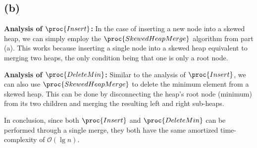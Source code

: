 \subsection{(b)}

\textbf{Analysis of $\proc{Insert}$:} In the case of inserting a new node into a skewed heap, we can simply employ the
$\proc{SkewedHeapMerge}$ algorithm from part (a). This works because inserting a single
node into a skewed heap equivalent to merging two heaps, the only condition being that one
is only a root node.\vspace{3mm}

\textbf{Analysis of $\proc{DeleteMin}$:} Similar to the analysis of $\proc{Insert}$, we can also use $\proc{SkewedHeapMerge}$
to delete the minimum element from a skewed heap.
This can be done by disconnecting the heap's root node (minimum) from its two children
and merging the resulting left and right sub-heaps.\vspace{3mm}

In conclusion, since both $\proc{Insert}$ and $\proc{DeleteMin}$ can be performed through
a single merge, they both have the same amortized time-complexity of $\mathcal{O}(\lg{n})$.